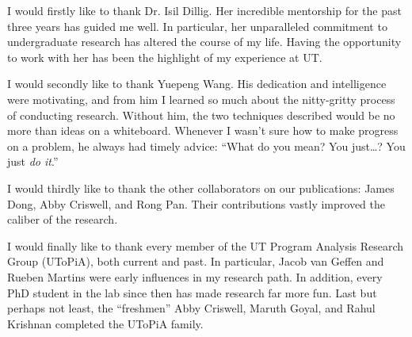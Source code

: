 \documentclass[]{article}
\begin{document}
        I would firstly like to thank Dr. Isil Dillig. Her incredible mentorship for the past three years has guided me well. In particular, her unparalleled commitment to undergraduate research has altered the course of my life. Having the opportunity to work with her has been the highlight of my experience at UT. 

        I would secondly like to thank Yuepeng Wang. His dedication and intelligence were motivating, and from him I learned so much about the nitty-gritty process of conducting research. Without him, the two techniques described would be no more than ideas on a whiteboard. Whenever I wasn't sure how to make progress on a problem, he always had timely advice: ``What do you mean? You just\ldots? You just \textit{do it}.''

        I would thirdly like to thank the other collaborators on our publications: James Dong, Abby Criswell, and Rong Pan. Their contributions vastly improved the caliber of the research. 

        I would finally like to thank every member of the UT Program Analysis Research Group (UToPiA), both current and past. In particular, Jacob van Geffen and Rueben Martins were early influences in my research path. In addition, every PhD student in the lab since then has made research far more fun. Last but perhaps not least, the ``freshmen'' Abby Criswell, Maruth Goyal, and Rahul Krishnan completed the UToPiA family. 


    
    




\end{document}
